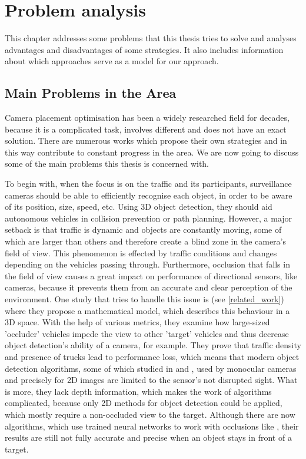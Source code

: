 \chapter{Problem analysis} \label{problem_analysis}
This chapter addresses some problems that this thesis tries to solve and analyses advantages and disadvantages of some strategies. It also includes information about which approaches serve as a model for our approach.

\section{Main Problems in the Area} \label{main_problems}
Camera placement optimisation has been a widely researched field for decades, because it is a complicated task, involves different and does not have an exact solution. There are numerous works which propose their own strategies and in this way contribute to constant progress in the area. We are now going to discuss some of the main problems this thesis is concerned with.

To begin with, when the focus is on the traffic and its participants, surveillance cameras should be able to efficiently recognise each object, in order to be aware of its position, size, speed, etc. Using 3D object detection, they should aid autonomous vehicles in collision prevention or path planning. However, a major setback is that traffic is dynamic and objects are constantly moving, some of which are larger than others and therefore create a blind zone in the camera's field of view. This phenomenon is effected by traffic conditions and changes depending on the vehicles passing through. Furthermore, occlusion that falls in the field of view causes a great impact on performance of directional sensors, like cameras, because it prevents them from an accurate and clear perception of the environment. One study that tries to handle this issue is \cite{occlusion_degree_model} (see \ref{related_work}) where they propose a mathematical model, which describes this behaviour in a 3D space. With the help of various metrics, they examine how large-sized 'occluder' vehicles impede the view to other 'target' vehicles and thus decrease object detection's ability of a camera, for example. They prove that traffic density and presence of trucks lead to performance loss, which means that modern object detection algorithms, some of which studied in \cite{camera_vs_lidar} and \cite{object_detection_list}, used by monocular cameras and precisely for 2D images are limited to the sensor's not disrupted sight. What is more, they lack depth information, which makes the work of algorithms complicated, because only 2D methods for object detection could be applied, which mostly require a non-occluded view to the target. Although there are now algorithms, which use trained neural networks to work with occlusions like \cite{object_detection_alg}, their results are still not fully accurate and precise when an object stays in front of a target.

